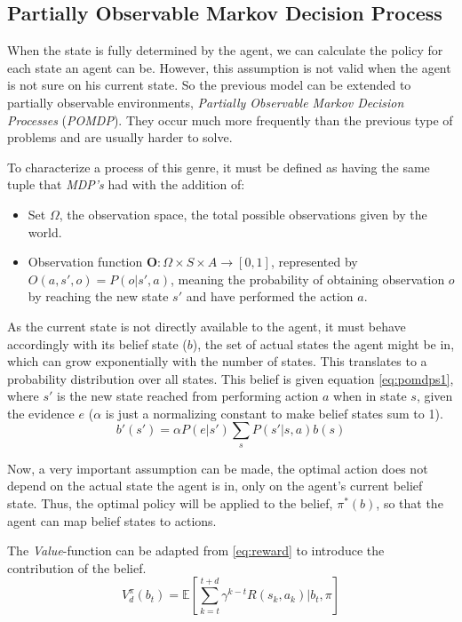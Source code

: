 \subsection{Partially Observable Markov Decision Process}
When the state is fully determined by the agent, we can calculate the policy
for each state an agent can be. However, this assumption is not valid when the
agent is not sure on his current state. So the previous model can be extended
to partially observable environments, \textit{Partially Observable Markov
Decision Processes} \cite{Russell2009} (\textit{POMDP}). They occur much more
frequently than the previous type of problems and are usually harder to solve.

To characterize a process of this genre, it must be defined as having the same
tuple that \textit{MDP's} had with the addition of:
\begin{itemize}
    \item Set $\Omega$, the observation space, the total possible
    observations given by the world.
    \item Observation function $\textbf{O}: \Omega \times S \times
    A \to [0,1]$, represented by $ O(a,s',o) = P(o|s',a)$, meaning the
    probability of obtaining observation $o$ by reaching the new state $s'$ and
    have performed the action $a$.
\end{itemize}

As the current state is not directly available to the agent, it must behave
accordingly with its belief state ($b$), the set of actual states the agent
might be in, which can grow exponentially with the number of states. This
translates to a probability distribution over all states.
This belief is given equation \ref{eq:pomdps1}, where $s'$ is the new state
reached from performing action $a$ when in state $s$, given the evidence $e$
($\alpha$ is just a normalizing constant to make belief states sum to 1).
\begin{equation}
    \label{eq:pomdps1}
    b'(s') = \alpha P(e|s')\displaystyle\sum_{s} P(s'|s,a)b(s)
\end{equation}

Now, a very important assumption can be made, the optimal action does not depend
on the actual state the agent is in, only on the agent's current belief state.
Thus, the optimal policy will be applied to the belief, $\pi^{*}(b)$, so that
the agent can map belief states to actions.

The \textit{Value}-function can be adapted from \ref{eq:reward} to introduce the
contribution of the belief.
\begin{equation}
    \label{eq:pomdpreward}
    V_d^\pi(b_t) = \mathbb{E}[\displaystyle\sum_{k=t}^{t+d} \gamma^{k-t}R(s_k,
    a_k)|b_t,\pi]
\end{equation}

